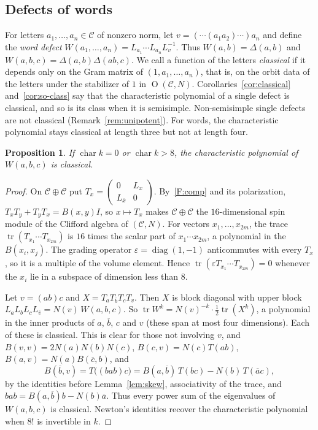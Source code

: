 \documentclass[11pt]{amsart}
\newtheorem{proposition}[theorem]{Proposition}
\theoremstyle{definition}
\theoremstyle{remark}
\newcommand{\C}{\mathcal{C}}
\newcommand{\conj}[1]{\overline{#1}}
\DeclareMathOperator{\tr}{tr}
\DeclareMathOperator{\Ort}{O}
\begin{document}
\subsection*{Defects of words}
For letters $a_1,\dots,a_n\in\C$ of nonzero norm, let $v=(\cdots(a_1a_2)\cdots)a_n$
and define the \emph{word defect}
$W(a_1,\dots,a_n)=L_{a_1}\cdots L_{a_n}L_v^{-1}$. Thus $W(a,b)=\Delta(a,b)$ and
$W(a,b,c)=\Delta(a,b)\Delta(ab,c)$. We call a function of the letters
\emph{classical} if it depends only on the Gram matrix of $(1,a_1,\dots,a_n)$,
that is, on the orbit data of the letters under the stabilizer of $1$ in
$\Ort(\C,N)$. Corollaries~\ref{cor:classical} and~\ref{cor:so-class} say that
the characteristic polynomial of a single defect is classical, and so is its
class when it is semisimple. Non-semisimple single defects are not classical
(Remark~\ref{rem:unipotent}). For words, the characteristic polynomial stays
classical at length three but not at length four.

\begin{proposition}\label{prop:word-three}
If $\operatorname{char}k=0$ or $\operatorname{char}k>8$, the characteristic
polynomial of $W(a,b,c)$ is classical.
\end{proposition}

\begin{proof}
On $\C\oplus\C$ put $T_x=\left(\begin{smallmatrix}0&L_x\\L_{\conj x}&0\end{smallmatrix}\right)$.
By~\ref{F:comp} and its polarization, $T_xT_y+T_yT_x=B(x,y)I$, so $x\mapsto T_x$
makes $\C\oplus\C$ the $16$-dimensional spin module of the Clifford algebra of
$(\C,N)$. For vectors $x_1,\dots,x_{2m}$, the trace $\tr(T_{x_1}\cdots T_{x_{2m}})$
is $16$ times the scalar part of $x_1\cdots x_{2m}$, a polynomial in the
$B(x_i,x_j)$. The grading operator $\varepsilon=\operatorname{diag}(1,-1)$
anticommutes with every $T_x$, so it is a multiple of the volume element. Hence
$\tr(\varepsilon T_{x_1}\cdots T_{x_{2m}})=0$ whenever the $x_i$ lie in a subspace
of dimension less than $8$.

Let $v=(ab)c$ and $X=T_aT_{\conj b}T_cT_v$. Then $X$ is block diagonal with upper
block $L_aL_bL_cL_{\conj v}=N(v)\,W(a,b,c)$. So
$\tr W^k=N(v)^{-k}\cdot\tfrac12\tr(X^k)$, a polynomial in the inner products
of $a$, $\conj b$, $c$ and $v$ (these span at most four dimensions). Each of
these is classical. This is clear for those not involving $v$, and
$B(v,v)=2N(a)N(b)N(c)$, $B(c,v)=N(c)T(ab)$, $B(a,v)=N(a)B(\conj c,b)$, and
\[
  B(\conj b,v)=T\bigl((bab)c\bigr)=B(a,\conj b)\,T(bc)-N(b)\,T(\conj ac),
\]
by the identities before Lemma~\ref{lem:skew}, associativity of the trace,
and $bab=B(a,\conj b)b-N(b)\conj a$. Thus every power sum of the eigenvalues of
$W(a,b,c)$ is classical. Newton's identities recover the characteristic
polynomial when $8!$ is invertible in $k$.
\end{proof}
\end{document}
